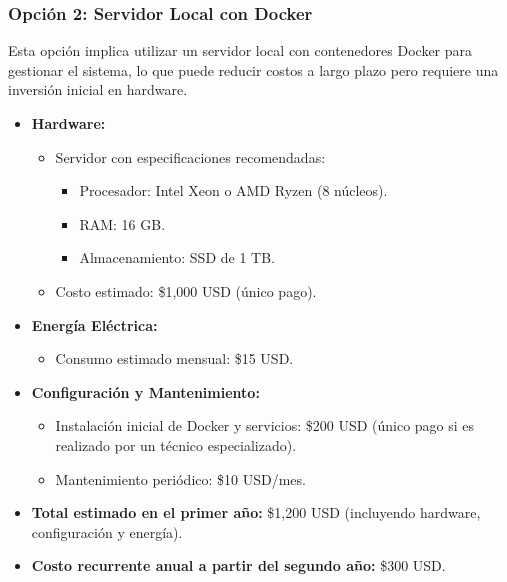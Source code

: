 \subsubsection{Opción 2: Servidor Local con Docker}
Esta opción implica utilizar un servidor local con contenedores Docker para gestionar el sistema, lo que puede reducir costos a largo plazo pero requiere una inversión inicial en hardware.
\begin{itemize}
    \item \textbf{Hardware:}
    \begin{itemize}
        \item Servidor con especificaciones recomendadas:
        \begin{itemize}
            \item Procesador: Intel Xeon o AMD Ryzen (8 núcleos).
            \item RAM: 16 GB.
            \item Almacenamiento: SSD de 1 TB.
        \end{itemize}
        \item Costo estimado: \$1,000 USD (único pago).
    \end{itemize}
    \item \textbf{Energía Eléctrica:}
    \begin{itemize}
        \item Consumo estimado mensual: \$15 USD.
    \end{itemize}
    \item \textbf{Configuración y Mantenimiento:}
    \begin{itemize}
        \item Instalación inicial de Docker y servicios: \$200 USD (único pago si es realizado por un técnico especializado).
        \item Mantenimiento periódico: \$10 USD/mes.
    \end{itemize}
    \item \textbf{Total estimado en el primer año:} \$1,200 USD (incluyendo hardware, configuración y energía).
    \item \textbf{Costo recurrente anual a partir del segundo año:} \$300 USD.
\end{itemize}

